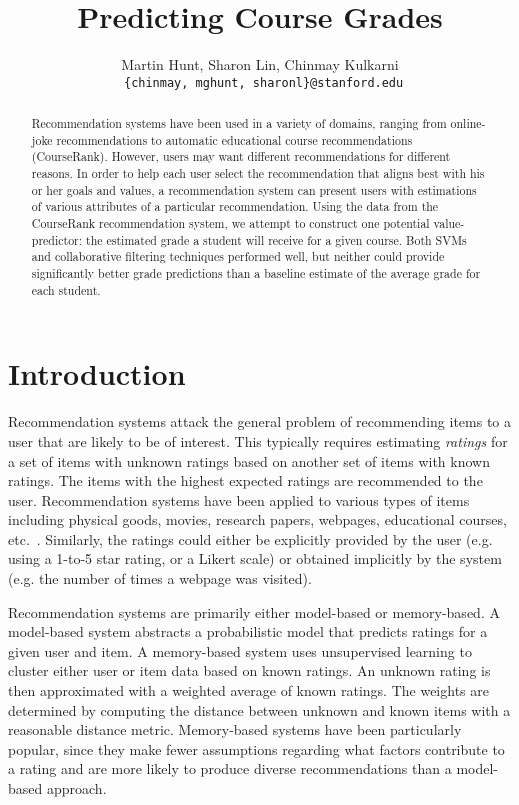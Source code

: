 \documentclass{article} %
\title{Predicting Course Grades}
\author{
Martin Hunt, Sharon Lin, Chinmay Kulkarni \\
\texttt{ \{chinmay, mghunt, sharonl\}@stanford.edu}
}
\begin{document}
\maketitle

\begin{abstract}
Recommendation systems have been used in a variety of domains, ranging from online-joke recommendations to automatic educational course recommendations (CourseRank). However, users may want different recommendations for different reasons.
In order to help each user select the recommendation that aligns best with his or her goals and values, a recommendation system can present users with estimations of various attributes of a particular recommendation.  Using the data from the CourseRank recommendation system, we attempt to construct one potential value-predictor: the estimated grade a student will receive for a given course.  Both SVMs and collaborative filtering techniques performed well, but neither could provide significantly better grade predictions than a baseline estimate of the average grade for each student.
\end{abstract}

\section{Introduction}
\label{sec:intro}
Recommendation systems attack the general problem of recommending items to a user that are likely to be of interest. This typically requires estimating \textit{ratings} for a set of items with unknown ratings based on another set of items with known ratings.  The items with the highest expected ratings are recommended to the user. Recommendation systems have been applied to various types of items including physical goods, movies, research papers, webpages, educational courses, etc.~\cite{schafer1999recommender}. Similarly, the ratings could either be explicitly provided by the user (e.g. using a 1-to-5 star rating, or a Likert scale) or obtained implicitly by the system (e.g. the number of times a webpage was visited).

Recommendation systems are primarily either model-based or memory-based. A model-based system abstracts a probabilistic model that predicts ratings for a given user and item. A memory-based system uses unsupervised learning to cluster either user or item data based on known ratings. An unknown rating is then approximated with a weighted average of known ratings.  The weights are determined by computing the distance between unknown and known items with a reasonable distance metric. Memory-based systems have been particularly popular, since they make fewer assumptions regarding what factors contribute to a rating and are more likely to produce diverse recommendations than a model-based approach. 
\end{document}
